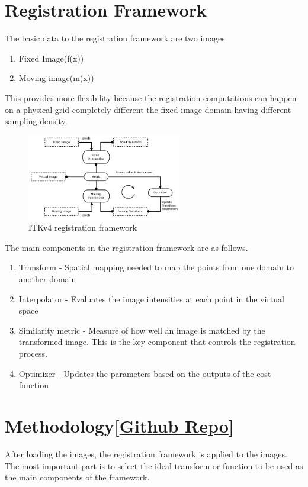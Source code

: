 \documentclass[11pt,english]{article}
\begin{document}
\section*{Registration Framework\cite{itkmanual2}}
The basic data to the registration framework are two images.  
\begin{enumerate}
    \item Fixed Image(f(x))
    \item Moving image(m(x))
\end{enumerate}
This provides more flexibility because the registration computations can happen on a physical grid completely different the fixed image domain having different sampling density. 
\begin{figure}[h!]
    \centering
    \includegraphics[width =0.6\textwidth] {images/framework.PNG}
    \caption{ITKv4 registration framework\cite{itkmanual2}}
    \label{fig:framework}
\end{figure}
The main components in the registration framework are as follows.
\begin{enumerate}
    \item Transform - Spatial mapping needed to map the points from one domain to another domain
    \item Interpolator - Evaluates the image intensities at each point in the virtual space
    \item Similarity metric - Measure of how well an image is matched by the transformed image. This is the key component that controls the registration process.
    \item Optimizer - Updates the parameters based on the outputs of the cost function
\end{enumerate}
\section*{Methodology[\href{https://github.com/Dineth-Mudalige/ImageRegistration.git}{\LARGE{Github Repo}}]}
After loading the images, the registration framework is applied to the images. The most important part is to select the ideal transform or function to be used as the main components of the framework.  
\end{document}
